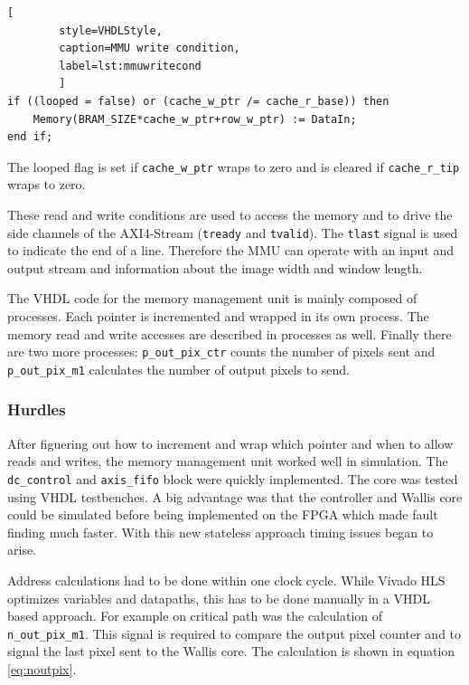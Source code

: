 \begin{minipage}{\linewidth}
    \begin{lstlisting}[
        style=VHDLStyle, 
        caption=MMU write condition, 
        label=lst:mmuwritecond
        ]
if ((looped = false) or (cache_w_ptr /= cache_r_base)) then
    Memory(BRAM_SIZE*cache_w_ptr+row_w_ptr) := DataIn;
end if;\end{lstlisting}
\end{minipage}

The looped flag is set if \texttt{cache\_w\_ptr} wraps to zero and is cleared if
\texttt{cache\_r\_tip} wraps to zero.

These read and write conditions are used to access the memory and to drive the
side channels of the AXI4-Stream (\texttt{tready} and \texttt{tvalid}). The 
\texttt{tlast} signal is used to indicate the end of a line. Therefore the MMU
can operate with an input and output stream and information about the image
width and window length.

The VHDL code for the memory management unit is mainly composed of processes.
Each pointer is incremented and wrapped in its own process. The memory read and
write accesses are described in processes as well. Finally there are two more
processes: \texttt{p\_out\_pix\_ctr} counts the number of pixels sent and
\texttt{p\_out\_pix\_m1} calculates the number of output pixels to send.



\subsubsection*{Hurdles}
After figuering out how to increment and wrap which pointer and when to allow
reads and writes, the memory management unit worked well in simulation. The
\texttt{dc\_control} and \texttt{axis\_fifo} block were quickly implemented. The
core was tested using VHDL testbenches. A big advantage was that the controller
and Wallis core could be simulated before being implemented on the FPGA which
made fault finding much faster. With this new stateless approach timing issues
began to arise. 

Address calculations had to be done within one clock cycle. While Vivado HLS
optimizes variables and datapaths, this has to be done manually in a VHDL based
approach. For example on critical path was the calculation of 
\texttt{n\_out\_pix\_m1}. This signal is required to compare the output pixel
counter and to signal the last pixel sent to the Wallis core. The calculation is
shown in equation \ref{eq:noutpix}.

